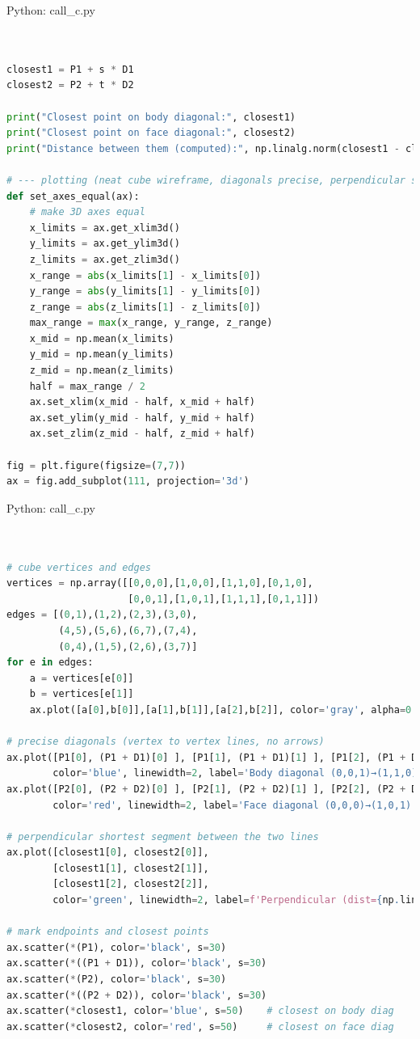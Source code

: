 \documentclass{beamer}
\numberwithin{equation}{section}
\theoremstyle{remark}
\begin{document}
\begin{frame}[fragile]{Python: call\_c.py}
\begin{lstlisting}[language=Python]


closest1 = P1 + s * D1
closest2 = P2 + t * D2

print("Closest point on body diagonal:", closest1)
print("Closest point on face diagonal:", closest2)
print("Distance between them (computed):", np.linalg.norm(closest1 - closest2))

# --- plotting (neat cube wireframe, diagonals precise, perpendicular segment) ---
def set_axes_equal(ax):
    # make 3D axes equal
    x_limits = ax.get_xlim3d()
    y_limits = ax.get_ylim3d()
    z_limits = ax.get_zlim3d()
    x_range = abs(x_limits[1] - x_limits[0])
    y_range = abs(y_limits[1] - y_limits[0])
    z_range = abs(z_limits[1] - z_limits[0])
    max_range = max(x_range, y_range, z_range)
    x_mid = np.mean(x_limits)
    y_mid = np.mean(y_limits)
    z_mid = np.mean(z_limits)
    half = max_range / 2
    ax.set_xlim(x_mid - half, x_mid + half)
    ax.set_ylim(y_mid - half, y_mid + half)
    ax.set_zlim(z_mid - half, z_mid + half)

fig = plt.figure(figsize=(7,7))
ax = fig.add_subplot(111, projection='3d')

\end{lstlisting}
\end{frame}

\begin{frame}[fragile]{Python: call\_c.py}
\begin{lstlisting}[language=Python]


# cube vertices and edges
vertices = np.array([[0,0,0],[1,0,0],[1,1,0],[0,1,0],
                     [0,0,1],[1,0,1],[1,1,1],[0,1,1]])
edges = [(0,1),(1,2),(2,3),(3,0),
         (4,5),(5,6),(6,7),(7,4),
         (0,4),(1,5),(2,6),(3,7)]
for e in edges:
    a = vertices[e[0]]
    b = vertices[e[1]]
    ax.plot([a[0],b[0]],[a[1],b[1]],[a[2],b[2]], color='gray', alpha=0.6)

# precise diagonals (vertex to vertex lines, no arrows)
ax.plot([P1[0], (P1 + D1)[0] ], [P1[1], (P1 + D1)[1] ], [P1[2], (P1 + D1)[2] ],
        color='blue', linewidth=2, label='Body diagonal (0,0,1)→(1,1,0)')
ax.plot([P2[0], (P2 + D2)[0] ], [P2[1], (P2 + D2)[1] ], [P2[2], (P2 + D2)[2] ],
        color='red', linewidth=2, label='Face diagonal (0,0,0)→(1,0,1)')

# perpendicular shortest segment between the two lines
ax.plot([closest1[0], closest2[0]],
        [closest1[1], closest2[1]],
        [closest1[2], closest2[2]],
        color='green', linewidth=2, label=f'Perpendicular (dist={np.linalg.norm(closest1-closest2):.4f})')

# mark endpoints and closest points
ax.scatter(*(P1), color='black', s=30)
ax.scatter(*((P1 + D1)), color='black', s=30)
ax.scatter(*(P2), color='black', s=30)
ax.scatter(*((P2 + D2)), color='black', s=30)
ax.scatter(*closest1, color='blue', s=50)    # closest on body diag
ax.scatter(*closest2, color='red', s=50)     # closest on face diag

\end{lstlisting}
\end{frame}
\end{document}
